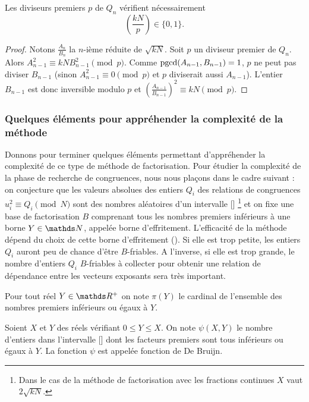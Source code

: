 \begin{proposition}
	Les diviseurs premiers $p$ de $Q_n$ vérifient nécessairement
	\[\left(\frac{kN}{p} \right) \in \{0, 1\}.\]
\end{proposition}

\begin{proof}
    Notons $\frac{A_n}{B_n}$ la $n$-ième réduite de $\sqrt{kN}$. 
    Soit $p$ un diviseur premier de $Q_n$. Alors $ A_{n-1}^2 \equiv kNB_{n-1}^2
	\pmod{p}$. Comme $\operatorname{pgcd}(A_{n-1},B_{n-1}) = 1$, $p$ ne peut pas diviser
	$B_{n-1}$ (sinon $A_{n-1}^2 \equiv 0 \pmod{p}$ et $p$ diviserait aussi
	$A_{n-1}$). L'entier $B_{n-1}$ est donc inversible modulo $p$ et $\left(
	\frac{A_{n-1}}{B_{n-1}}\right )^2 \equiv kN \pmod{p}$.
\end{proof}

\subsubsection{Quelques éléments pour appréhender la complexité de la méthode}

Donnons pour terminer quelques éléments permettant d'appréhender la complexité 
de ce type de méthode de factorisation.  Pour étudier la complexité de la phase 
de recherche de congruences, nous nous plaçons dans le cadre suivant : on 
conjecture que les valeurs absolues des entiers $Q_i$ 
des relations de congruences $u_i^2 \equiv Q_i \pmod{N}$ sont des nombres 
aléatoires d'un intervalle [\![1, X]\!] \footnote{Dans le cas de la méthode de 
factorisation avec les fractions continues $X$ vaut $2\sqrt{kN}$. } et on fixe 
une base de factorisation $B$ comprenant tous les nombres premiers inférieurs à une 
borne $Y \in \N$, appelée borne d'effritement. L'efficacité de la méthode dépend du
choix de cette borne d'effritement (\cite{Guillot}). Si elle est trop petite, les entiers $Q_i$
auront peu de chance d'être $B$-friables. A l'inverse, si elle est trop grande,
le nombre d'entiers $Q_i$ $B$-friables à collecter pour obtenir une relation de 
dépendance entre les vecteurs exposants sera très important.
\begin{notation}
    Pour tout réel $Y \in \R^+$ on note $\pi(Y)$ le cardinal de l'ensemble des
    nombres premiers inférieurs ou égaux à $Y$.
\end{notation}
\begin{notation}
    Soient $X$ et $Y$ des réels vérifiant $0 \leq Y \leq X$. On note $\psi(X,Y)$
    le nombre d'entiers dans l'intervalle [\![1, X]\!]  dont les facteurs premiers  
    sont tous inférieurs ou égaux à $Y$. La fonction $\psi$ est appelée fonction 
    de De Bruijn.
\end{notation}


